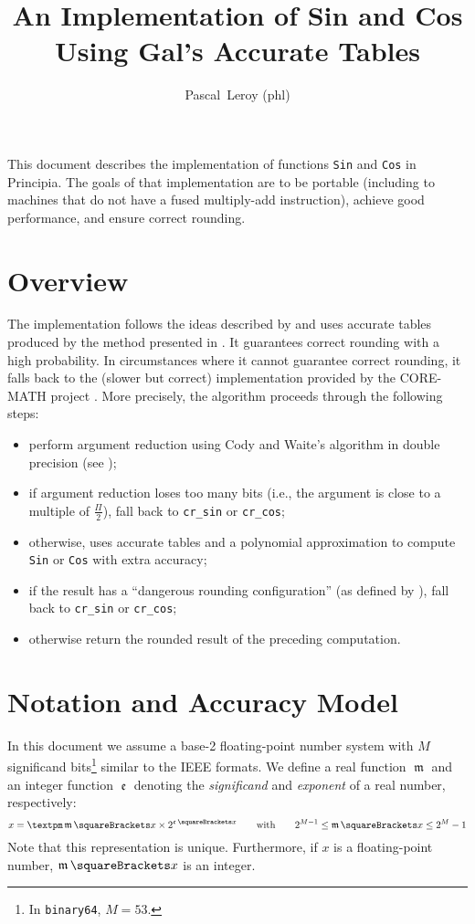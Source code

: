\documentclass[10pt, a4paper, twoside]{basestyle}
\title{An Implementation of Sin and Cos Using Gal's Accurate Tables}
\date{\printdate{2025-02-02}}
\author{Pascal~Leroy (phl)}
\DeclareMathOperator{\mant}{\mathfrak m}
\DeclareMathOperator{\expn}{\mathfrak e}
\begin{document}
\maketitle
\begin{sloppypar}
\noindent
This document describes the implementation of functions \texttt{Sin} and \texttt{Cos} in Principia.  The goals of that implementation are to be portable (including to machines that do not have a fused multiply-add instruction), achieve good performance, and ensure correct rounding.
\end{sloppypar}

\section*{Overview}
The implementation follows the ideas described by \cite{GalBachelis1991} and uses accurate tables produced by the method presented in \cite{StehléZimmermann2005}.  It guarantees correct rounding with a high probability.  In circumstances where it cannot guarantee correct rounding, it falls back to the (slower but correct) implementation provided by the CORE-MATH project \cite{SibidanovZimmermannGlondu2022} \cite{ZimmermannSibidanovGlondu2024}.  More precisely, the algorithm proceeds through the following steps:
\begin{itemize}[nosep]
\item perform argument reduction using Cody and Waite's algorithm in double precision (see \cite[379]{MullerBrisebarreDeDinechinJeannerodLefevreMelquiondRevolStehleTorres2010});
\item if argument reduction loses too many bits (i.e., the argument is close to a multiple of $\frac{\Pi}{2}$), fall back to \texttt{cr\_sin} or \texttt{cr\_cos};
\item otherwise, uses accurate tables and a polynomial approximation to compute \texttt{Sin} or \texttt{Cos} with extra accuracy;
\item if the result has a ``dangerous rounding configuration'' (as defined by \cite{GalBachelis1991}), fall back to \texttt{cr\_sin} or \texttt{cr\_cos};
\item otherwise return the rounded result of the preceding computation.
\end{itemize}

\section*{Notation and Accuracy Model} 
In this document we assume a base-2 floating-point number system with $M$ significand bits\footnote{In \texttt{binary64}, $M = 53$.} similar to the IEEE formats.  We define a real  function $\mant$ and an integer function $\expn$ denoting the \emph{significand} and \emph{exponent} of a real number, respectively:
\[
x = ±\mant\of{x} \times 2^{\expn\of{x}} \qquad\text{with}\qquad 2^{M-1} \leq \mant\of{x} \leq 2^M - 1
\]
Note that this representation is unique.  Furthermore, if $x$ is a floating-point number, $\mant\of{x}$ is an integer.
\end{document}
